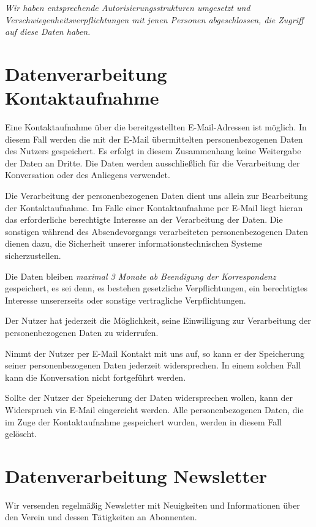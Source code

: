 \documentclass[a4paper, 10pt, headings=normal]{scrartcl}
\begin{document}
\begin{multicols*}{2}
\emph{Wir haben entsprechende Autorisierungsstrukturen umgesetzt und Verschwiegenheitsverpflichtungen mit jenen Personen abgeschlossen, die Zugriff auf diese Daten haben.}

\section{Datenverarbeitung Kontaktaufnahme}

Eine Kontaktaufnahme über die bereitgestellten E-Mail-Adressen ist möglich.
In diesem Fall werden die mit der E-Mail übermittelten personenbezogenen Daten des Nutzers gespeichert.
Es erfolgt in diesem Zusammenhang keine Weitergabe der Daten an Dritte. Die Daten werden ausschließlich für die Verarbeitung der Konversation oder des Anliegens verwendet.

Die Verarbeitung der personenbezogenen Daten dient uns allein zur Bearbeitung der Kontaktaufnahme.
Im Falle einer Kontaktaufnahme per E-Mail liegt hieran das erforderliche berechtigte Interesse an der Verarbeitung der Daten.
Die sonstigen während des Absendevorgangs verarbeiteten personenbezogenen Daten dienen dazu, die Sicherheit unserer informationstechnischen Systeme sicherzustellen.

Die Daten bleiben \emph{maximal 3 Monate ab Beendigung der Korrespondenz} gespeichert, es sei denn, es bestehen gesetzliche Verpflichtungen, ein berechtigtes Interesse unsererseits oder sonstige vertragliche Verpflichtungen.

Der Nutzer hat jederzeit die Möglichkeit, seine Einwilligung zur Verarbeitung der personenbezogenen Daten zu widerrufen.

Nimmt der Nutzer per E-Mail Kontakt mit uns auf, so kann er der Speicherung seiner personenbezogenen Daten jederzeit widersprechen.
In einem solchen Fall kann die Konversation nicht fortgeführt werden.

Sollte der Nutzer der Speicherung der Daten widersprechen wollen, kann der Widerspruch via E-Mail eingereicht werden.
Alle personenbezogenen Daten, die im Zuge der Kontaktaufnahme gespeichert wurden, werden in diesem Fall gelöscht.

\section{Datenverarbeitung Newsletter}

Wir versenden regelmäßig Newsletter mit Neuigkeiten und Informationen über den Verein und dessen Tätigkeiten an Abonnenten.


\end{multicols*}
\end{document}
